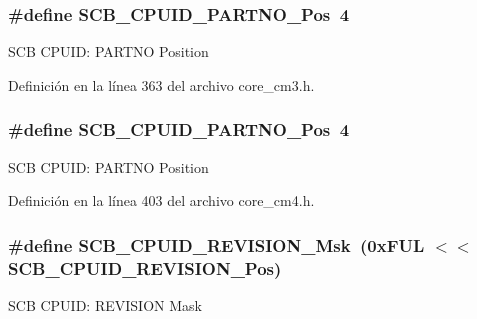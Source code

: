 \subsubsection[{\texorpdfstring{S\+C\+B\+\_\+\+C\+P\+U\+I\+D\+\_\+\+P\+A\+R\+T\+N\+O\+\_\+\+Pos}{SCB_CPUID_PARTNO_Pos}}]{\setlength{\rightskip}{0pt plus 5cm}\#define S\+C\+B\+\_\+\+C\+P\+U\+I\+D\+\_\+\+P\+A\+R\+T\+N\+O\+\_\+\+Pos~4}\hypertarget{group___c_m_s_i_s___s_c_b_ga705f68eaa9afb042ca2407dc4e4629ac}{}\label{group___c_m_s_i_s___s_c_b_ga705f68eaa9afb042ca2407dc4e4629ac}
S\+CB C\+P\+U\+ID\+: P\+A\+R\+T\+NO Position 

Definición en la línea 363 del archivo core\+\_\+cm3.\+h.

\subsubsection[{\texorpdfstring{S\+C\+B\+\_\+\+C\+P\+U\+I\+D\+\_\+\+P\+A\+R\+T\+N\+O\+\_\+\+Pos}{SCB_CPUID_PARTNO_Pos}}]{\setlength{\rightskip}{0pt plus 5cm}\#define S\+C\+B\+\_\+\+C\+P\+U\+I\+D\+\_\+\+P\+A\+R\+T\+N\+O\+\_\+\+Pos~4}\hypertarget{group___c_m_s_i_s___s_c_b_ga705f68eaa9afb042ca2407dc4e4629ac}{}\label{group___c_m_s_i_s___s_c_b_ga705f68eaa9afb042ca2407dc4e4629ac}
S\+CB C\+P\+U\+ID\+: P\+A\+R\+T\+NO Position 

Definición en la línea 403 del archivo core\+\_\+cm4.\+h.

\subsubsection[{\texorpdfstring{S\+C\+B\+\_\+\+C\+P\+U\+I\+D\+\_\+\+R\+E\+V\+I\+S\+I\+O\+N\+\_\+\+Msk}{SCB_CPUID_REVISION_Msk}}]{\setlength{\rightskip}{0pt plus 5cm}\#define S\+C\+B\+\_\+\+C\+P\+U\+I\+D\+\_\+\+R\+E\+V\+I\+S\+I\+O\+N\+\_\+\+Msk~(0x\+F\+U\+L $<$$<$ S\+C\+B\+\_\+\+C\+P\+U\+I\+D\+\_\+\+R\+E\+V\+I\+S\+I\+O\+N\+\_\+\+Pos)}\hypertarget{group___c_m_s_i_s___s_c_b_ga2ec0448b6483f77e7f5d08b4b81d85df}{}\label{group___c_m_s_i_s___s_c_b_ga2ec0448b6483f77e7f5d08b4b81d85df}
S\+CB C\+P\+U\+ID\+: R\+E\+V\+I\+S\+I\+ON Mask 

